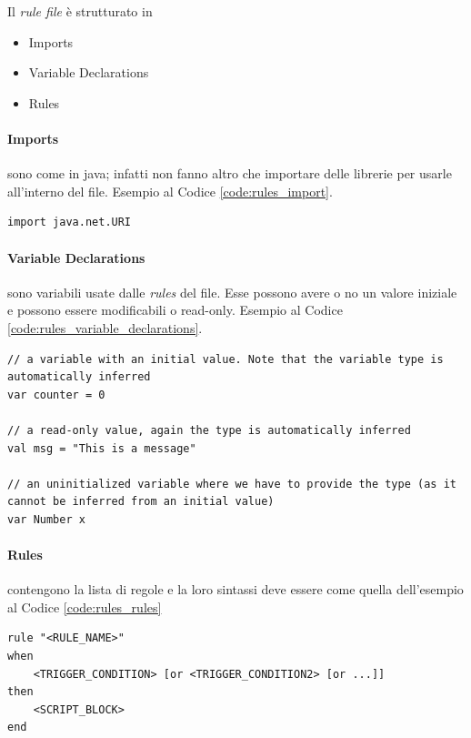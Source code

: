 Il {\em rule file} è strutturato in 
\begin{itemize}
    \item Imports
    \item Variable Declarations
    \item Rules
\end{itemize}

\paragraph{Imports} sono come in java; infatti non fanno altro che importare delle librerie per usarle all'interno del file. Esempio al Codice \ref{code:rules_import}.

\begin{lstlisting}[caption=Import, label=code:rules_import]
import java.net.URI
\end{lstlisting}

\paragraph{Variable Declarations} sono variabili usate dalle {\em rules} del file. Esse possono avere o no un valore iniziale e possono essere modificabili o read-only. Esempio al Codice \ref{code:rules_variable_declarations}.

\begin{lstlisting}[caption=Variable Declarations, label=code:rules_variable_declarations]
// a variable with an initial value. Note that the variable type is automatically inferred
var counter = 0

// a read-only value, again the type is automatically inferred
val msg = "This is a message"

// an uninitialized variable where we have to provide the type (as it cannot be inferred from an initial value)
var Number x
\end{lstlisting}

\paragraph{Rules} contengono la lista di regole e la loro sintassi deve essere come quella dell'esempio al Codice \ref{code:rules_rules}

\begin{lstlisting}[caption=Rules,label=code:rules_rules]
rule "<RULE_NAME>"
when
    <TRIGGER_CONDITION> [or <TRIGGER_CONDITION2> [or ...]]
then
    <SCRIPT_BLOCK>
end
\end{lstlisting}

